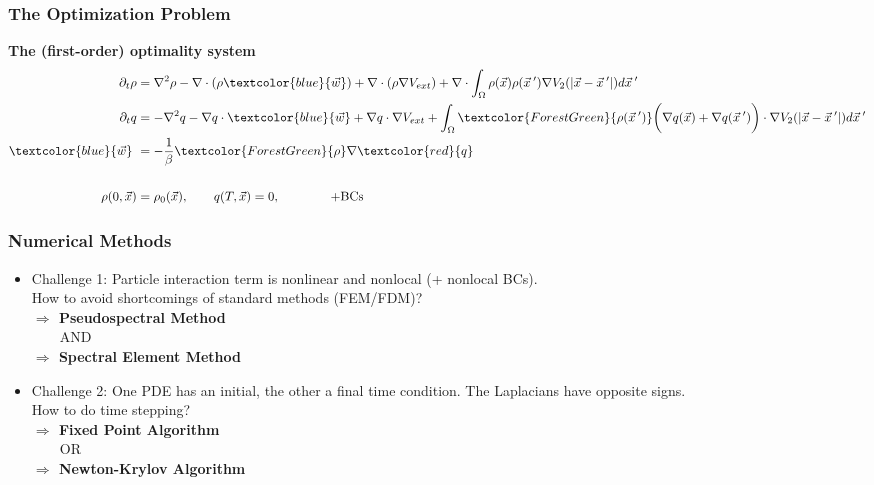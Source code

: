 \documentclass[aspectratio=169,xcolor=dvipsnames]{beamer}
\begin{document}
\begin{frame}
	\frametitle{The Optimization Problem}
	\textbf{The (first-order) optimality system}\\
     
	\begin{align*}
	 \partial_t \rho &= \nabla^2 \rho - \nabla \cdot (\rho \textcolor{blue}{\vec{w}}) + \nabla \cdot \left(\rho \nabla V_{ext}\right)
	+ \nabla \cdot \int_\Omega \rho(\vec{x}) \rho(\vec{x}\hspace{0.2em}') \nabla V_2(|\vec{x}-\vec{x}\hspace{0.2em}'|)d\vec{x}\hspace{0.2em}'  \\
	\partial_t q &= -\nabla^2 q - \nabla q \cdot \textcolor{blue}{\vec{w}} + \nabla q \cdot \nabla V_{ext} + \int_\Omega \textcolor{ForestGreen}{\rho(\vec{x}\hspace{0.2em}')} \bigg(\nabla q(\vec{x}) + \nabla q(\vec{x}\hspace{0.2em}')\bigg)\cdot  \nabla V_2(|\vec{x}-\vec{x}\hspace{0.2em}'|)d\vec{x}\hspace{0.2em}' \\
    \textcolor{blue}{\vec{w}} \ &= - \frac{1}{\beta}\textcolor{ForestGreen}{\rho} \nabla  \textcolor{red}{q}\\
    \\
    \rho(0,\vec{x})&=\rho_0(\vec{x}), \qquad q(T,\vec{x})= 0, \qquad \qquad \text{+BCs}\\
	\end{align*}
\end{frame}




\begin{frame}
	\frametitle{Numerical Methods}

	\begin{itemize} 
		\item Challenge 1: Particle interaction term is nonlinear and nonlocal (+ nonlocal BCs).
		\\How to avoid shortcomings of standard methods (FEM/FDM)?\\
		\vspace{0.3 cm}		
		\textbf{$\Rightarrow$ Pseudospectral Method}\\
		\ \ \ \ AND\\
		\textbf{$\Rightarrow$ Spectral Element Method}		
		\vspace{0.2 cm}
		\item Challenge 2: One PDE has an initial, the other a final time condition. The Laplacians have opposite signs. \\How to do time stepping?\\
		\vspace{0.3 cm}	
		\textbf{$\Rightarrow$ Fixed Point Algorithm}\\
		\ \ \ \ OR\\
		\textbf{$\Rightarrow$ Newton-Krylov Algorithm}
	\end{itemize}

\end{frame}
\end{document}
